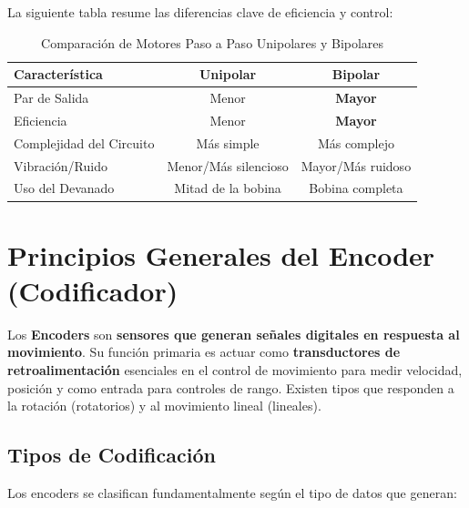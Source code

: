 La siguiente tabla resume las diferencias clave de eficiencia y control:

\begin{table}[h]
    \centering
    \caption{Comparación de Motores Paso a Paso Unipolares y Bipolares}
    \label{tab:motores}
    \begin{tabular}{|l|c|c|}
        \hline
        \textbf{Característica} & \textbf{Unipolar} & \textbf{Bipolar} \\
        \hline
        Par de Salida & Menor & \textbf{Mayor} \\
        \hline
        Eficiencia & Menor & \textbf{Mayor} \\
        \hline
        Complejidad del Circuito & Más simple & Más complejo \\
        \hline
        Vibración/Ruido & Menor/Más silencioso & Mayor/Más ruidoso \\
        \hline
        Uso del Devanado & Mitad de la bobina & Bobina completa \\
        \hline
    \end{tabular}
\end{table}

\section{Principios Generales del Encoder (Codificador) \cite{WestEncoder}}

Los \textbf{Encoders} son \textbf{sensores que generan señales digitales en respuesta al movimiento}. Su función primaria es actuar como \textbf{transductores de retroalimentación} esenciales en el control de movimiento para medir velocidad, posición y como entrada para controles de rango. Existen tipos que responden a la rotación (rotatorios) y al movimiento lineal (lineales).

\subsection{Tipos de Codificación}

Los encoders se clasifican fundamentalmente según el tipo de datos que generan:

